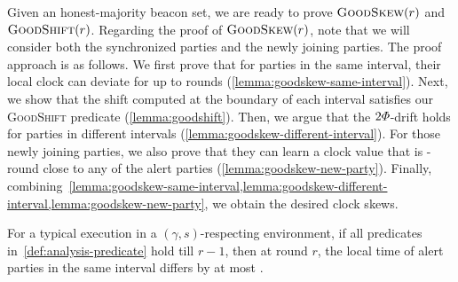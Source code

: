 Given an honest-majority beacon set, we are ready to prove $\textsc{GoodSkew}(r)$ and $\textsc{GoodShift}(r)$.
%
Regarding the proof of $\textsc{GoodSkew}(r)$, note that we will consider both the synchronized parties and the newly joining parties.
%
The proof approach is as follows.
%
We first prove that for parties in the same interval, their local clock can deviate for up to \maxskew rounds (\cref{lemma:goodskew-same-interval}).
%
Next, we show that the shift computed at the boundary of each interval satisfies our \textsc{GoodShift} predicate (\cref{lemma:goodshift}).
%
Then, we argue that the $2\varPhi$-drift holds for parties in different intervals (\cref{lemma:goodskew-different-interval}).
%
For those newly joining parties, we also prove that they can learn a clock value that is \maxskew-round close to any of the alert parties (\cref{lemma:goodskew-new-party}).
%
Finally, combining~\cref{lemma:goodskew-same-interval,lemma:goodskew-different-interval,lemma:goodskew-new-party}, we obtain the desired clock skews.

\begin{lemma} \label{lemma:goodskew-same-interval}
    For a typical execution in a $(\gamma, s)$-respecting environment, if all predicates in~\cref{def:analysis-predicate} hold till $r - 1$, then at round $r$, the local time of alert parties in the same interval differs by at most \maxskew.
\end{lemma}

